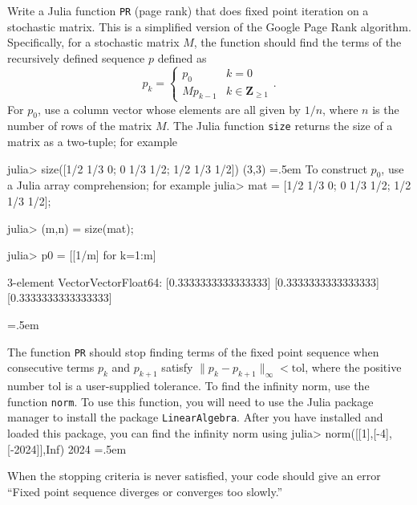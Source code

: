 \documentclass[12pt,fleqn]{exam}
\newcommand{\integers}{\mathbf{Z}}
\newenvironment{cverbatim}
 {\SaveVerbatim{cverb}}
 {\endSaveVerbatim
  \flushleft\fboxrule=0pt\fboxsep=.5em
  \colorbox{cverbbg}{\BUseVerbatim{cverb}}%
  \endflushleft
}
\begin{document}
\begin{questions}

\question [10] Write a Julia function \texttt{PR} (page rank) that does fixed point iteration on a stochastic matrix.   This is a
simplified version of the Google Page Rank algorithm. Specifically,  for a stochastic matrix
$M$, the function should find the terms of the recursively defined sequence $p$ defined as
\begin{equation*}
    p_{k} = \begin{cases} p_0 & k = 0 \\    M p_{k-1}  & k  \in \integers_{\geq 1}  \end{cases}.
\end{equation*}
For $p_0$, use a column vector whose elements are all given by $1/n$, where $n$ is the number of rows of the matrix $M$.  The Julia function \texttt{size} returns the size of a matrix as a two-tuple; for example

\begin{cverbatim}
julia> size([1/2 1/3 0; 0 1/3 1/2; 1/2 1/3 1/2])
       (3,3)
\end{cverbatim}
To construct $p_0$, use a Julia array comprehension;  for example
\begin{cverbatim}
julia> mat = [1/2 1/3 0; 0 1/3 1/2; 1/2 1/3 1/2];

julia> (m,n) = size(mat);

julia> p0 = [[1/m] for k=1:m]

3-element Vector{Vector{Float64}}:
 [0.3333333333333333]
 [0.3333333333333333]
 [0.3333333333333333]

\end{cverbatim}

The function \texttt{PR} should stop finding terms of the fixed point sequence when consecutive terms $p_k$ and $p_{k+1}$ satisfy 
$\| p_k - p_{k+1} \|_{\infty}  < \text{tol}$, where the positive number $\text{tol}$ is a user-supplied tolerance.  To find the infinity norm, use the function \texttt{norm}. To use this function, you will need
to use the Julia package manager to install the package \texttt{LinearAlgebra}.  After you have installed and loaded this package, 
you can find the infinity norm using 
\begin{cverbatim}
julia> norm([[1],[-4], [-2024]],Inf)
     2024
\end{cverbatim}

When the stopping criteria is never satisfied, your code should give an error ``Fixed point sequence diverges or converges too slowly.''


\end{questions}
\end{document}
